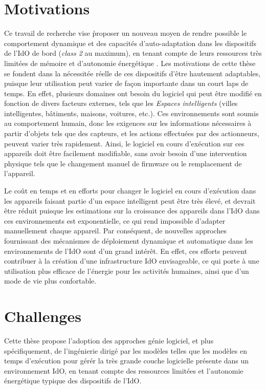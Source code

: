 \section*{Motivations}
Ce travail de recherche vise \` proposer un nouveau moyen de rendre possible le comportement dynamique et des capacit\'es d'auto-adaptation dans les dispositifs de l'IdO de bord (\textit{class 2} \cite{rfc7228} au maximum), en tenant compte de leurs ressources tr\`es limit\'ees de mémoire et d'autonomie \'energ\'etique .
Les motivations de cette th\`ese se fondent dans la n\'ecessit\'ee réelle de ces dispositifs d'\^etre hautement adaptables, puisque leur utilisation peut varier de fa\c{c}on importante dans un court laps de temps.
En effet, plusieurs domaines ont besoin du logiciel qui peut \^etre modifi\'e en fonction de divers facteurs externes, tels que les \textit{Espaces intelligents} (villes intelligentes, b\^atiments, maisons, voitures, etc.).
Ces environnements sont soumis au comportement humain, donc les exigences sur les informations n\'ecessaires \`a partir d'objets tels que des capteurs, et les actions effectu\'ees par des actionneurs, peuvent varier tr\`es rapidement.
Ainsi, le logiciel en cours d'ex\'ecution sur ces appareils doit être facilement modifiable, sans avoir besoin d'une intervention physique tels que le changement manuel de firmware ou le remplacement de l'appareil.

Le co\^ut en temps et en efforts pour changer le logiciel en cours d'ex\'ecution dans les appareils faisant partie d'un espace intelligent peut \^etre tr\`es \'elev\'e, et devrait \^etre r\'eduit puisque les estimations sur la croissance des appareils dans l'IdO dans ces environnements est exponentielle, ce qui rend impossible d'adapter manuellement chaque appareil.
Par conséquent, de nouvelles approches fournissant des m\'ecanismes de d\'eploiement dynamique et automatique dans les environnements de l'IdO sont d'un grand int\'er\^et.
En effet, ces efforts peuvent contribuer \`a la cr\'eation d'une infrastructure IdO envisageable, ce qui porte \`a une utilisation plus efficace de l'\'energie pour les activités humaines, ainsi que d'un mode de vie plus confortable.


\section*{Challenges}
Cette th\`ese propose l'adoption des approches génie logiciel, et plus sp\'ecifiquement, de l'ingénierie dirig\'e par les mod\`eles telles que les modèles en temps d'ex\'ecution \cite{morin2010leveraging} pour g\'er\'er la tr\`es grande couche logicielle pr\'esente dans un environnement IdO, en tenant compte des ressources limit\'ees et l'autonomie \'energ\'etique typique des dispositifs de l'IdO.

